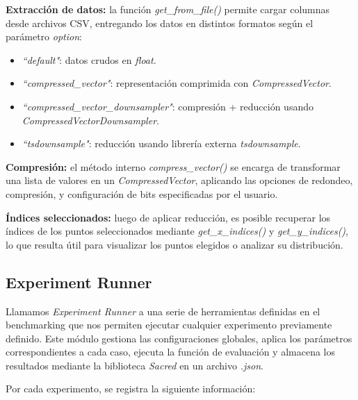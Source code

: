 \vspace{0.5em}
\textbf{Extracción de datos:} la función \textit{get\_from\_file()} permite cargar columnas desde archivos CSV, entregando los datos en distintos formatos según el parámetro \textit{option}:
\begin{itemize}
    \item \textit{``default"}: datos crudos en \textit{float}.
    \item \textit{``compressed\_vector"}: representación comprimida con \textit{CompressedVector}.
    \item \textit{``compressed\_vector\_downsampler"}: compresión + reducción usando \textit{CompressedVectorDownsampler}.
    \item \textit{``tsdownsample"}: reducción usando librería externa \textit{tsdownsample}.
\end{itemize}

\vspace{0.5em}
\textbf{Compresión:} el método interno \textit{compress\_vector()} se encarga de transformar una lista de valores en un \textit{CompressedVector}, aplicando las opciones de redondeo, compresión, y configuración de bits especificadas por el usuario.

\vspace{0.5em}
\textbf{Índices seleccionados:} luego de aplicar reducción, es posible recuperar los índices de los puntos seleccionados mediante \textit{get\_x\_indices()} y \textit{get\_y\_indices()}, lo que resulta útil para visualizar los puntos elegidos o analizar su distribución.

\subsection{Experiment Runner}

Llamamos \textit{Experiment Runner} a una serie de herramientas definidas en el benchmarking que nos permiten ejecutar cualquier experimento previamente definido. Este módulo gestiona las configuraciones globales, aplica los parámetros correspondientes a cada caso, ejecuta la función de evaluación y almacena los resultados mediante la biblioteca \textit{Sacred} en un archivo \textit{.json}.

Por cada experimento, se registra la siguiente información:

